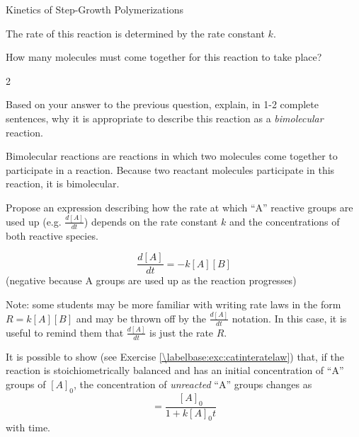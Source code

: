 \begin{activity}{Kinetics of Step-Growth Polymerizations}
\begin{model}
	The rate of this reaction is determined by the rate constant $k$.

\end{model}


\begin{ctqs}

	\question How many molecules must come together for this reaction to take place?
	
		\begin{solution}[0.5in]
			2
		\end{solution}
	
	\question Based on your answer to the previous question, explain, in 1-2 complete sentences, why it is appropriate to describe this reaction as a \emph{bimolecular} reaction.
	
		\begin{solution}[1in]
			Bimolecular reactions are reactions in which two molecules come together to participate in a reaction.  Because two reactant molecules participate in this reaction, it is bimolecular.
		\end{solution}
	
	\question Propose an expression describing how the rate at which ``A'' reactive groups are used up (e.g. $\frac{d[A]}{dt}$) depends on the rate constant $k$ and the concentrations of both reactive species.
		\label{\labelbase:ctq:proposeratelaw}
		
		\begin{solution}[1in]
			\begin{equation*}
				\frac{d[A]}{dt} = -k[A][B]
			\end{equation*}
			(negative because A groups are used up as the reaction progresses)
			
			Note: some students may be more familiar with writing rate laws in the form $R = k[A][B]$ and may be thrown off by the $\frac{d[A]}{dt}$ notation.  In this case, it is useful to remind them that $\frac{d[A]}{dt}$ is just the rate $R$.
			
		\end{solution}
		
\end{ctqs}

\begin{infobox}
	It is possible to show (see Exercise \ref{\labelbase:exc:catinteratelaw}) that, if the reaction is stoichiometrically balanced and has an initial concentration of ``A'' groups of $[A]_0$, the concentration of \emph{unreacted} ``A'' groups changes as
	\begin{equation*}
		[A] = \frac{[A]_0}{1 + k[A]_0 t}
	\end{equation*}	
	with time.
	\label{\labelbase:infobox:catintegrated}
\end{infobox}


\end{activity}
